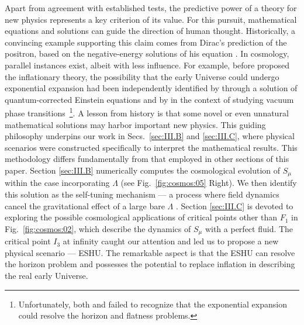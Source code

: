 \documentclass[aps,prd,twocolumn]{revtex4-2}
\begin{document}
Apart from agreement with established tests, the predictive power of a theory for new physics represents a key criterion of its value. For this pursuit, mathematical equations and solutions can guide the direction of human thought. Historically, a convincing example supporting this claim comes from Dirac's prediction of the positron, based on the negative-energy solutions of his equation \cite{Dirac1931.ProcRSocLondA.133.60}. In cosmology, parallel instances exist, albeit with less influence. For example, before \citet{Guth1981.PRD.23.347} proposed the inflationary theory, the possibility that the early Universe could undergo exponential expansion had been independently identified by \citet{Starobinsky1980.PLB.91.99} through a solution of quantum-corrected Einstein equations and by \citet{Sato1981.MNRAS.195.467} in the context of studying vacuum phase transitions~\footnote{Unfortunately, both \citet{Starobinsky1980.PLB.91.99} and \citet{Sato1981.MNRAS.195.467} failed to recognize that the exponential expansion could resolve the horizon and flatness problems.}. A lesson from history is that some novel or even unnatural mathematical solutions may harbor important new physics. This guiding philosophy underpins our work in Secs.~\ref{sec:III.B} and \ref{sec:III.C}, where physical scenarios were constructed specifically to interpret the mathematical results. This methodology differs fundamentally from that employed in other sections of this paper. Section \ref{sec:III.B} numerically computes the cosmological evolution of $S_\mu$ within the case incorporating $\Lambda$ (see Fig.~\ref{fig:cosmos:05} Right). We then identify this solution as the self-tuning mechanism --- a process where field dynamics cancel the gravitational effect of a large bare $\Lambda$ \cite{Dolgov1985.JETPLett.41.345,Ford1987.PRD.35.2339,Charmousis2012.PRL.108.051101}. Section \ref{sec:III.C} is devoted to exploring the possible cosmological applications of critical points other than $F_1$ in Fig.~\ref{fig:cosmos:02}, which describe the dynamics of $S_\mu$ with a perfect fluid. The critical point $I_3$ at infinity caught our attention and led us to propose a new physical scenario --- ESHU. The remarkable aspect is that the ESHU can resolve the horizon problem and possesses the potential to replace inflation in describing the real early Universe.
\end{document}
